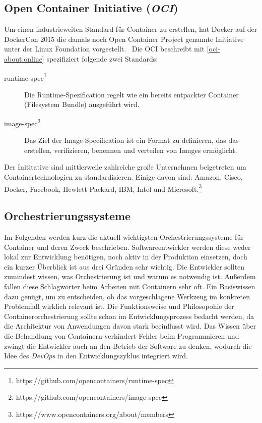 \subsection{Open Container Initiative (\emph{OCI})}
\label{sec:open-container-initiative}
Um einen industrieweiten Standard für Container zu erstellen, hat Docker auf der DockerCon 2015 die damals noch Open Container Project genannte Initiative unter der Linux Foundation vorgestellt.~\autocite{docker-ocp:online}
Die OCI beschreibt mit \autoref{oci-about:online} spezifiziert folgende zwei Standards:
\begin{description}
    \item [runtime-spec\footnote{https://github.com/opencontainers/runtime-spec}] Die Runtime-Spezification regelt wie ein bereits entpackter Container (Filesystem Bundle) ausgeführt wird.
    \item [image-spec\footnote{https://github.com/opencontainers/image-spec}] Das Ziel der Image-Specification ist ein Format zu definieren, das das erstellen, verifizieren, benennen und verteilen von Images ermöglicht.
\end{description}
Der Inititative sind mittlerweile zahlreiche große Unternehmen beigetreten um Containertechnologien zu standardisieren. Einige davon sind: Amazon, Cisco, Docker, Facebook, Hewlett Packard, IBM, Intel und Microsoft.\footnote{https://www.opencontainers.org/about/members}

\subsection{Orchestrierungssysteme}
\label{sec:orchestrierungssysteme}
Im Folgenden werden kurz die aktuell wichtigsten Orchestrierungssysteme für Container und deren Zweck beschrieben.
Softwareentwickler werden diese weder lokal zur Entwicklung benötigen, noch aktiv in der Produktion einsetzen, doch ein kurzer Überblick ist aus drei Gründen sehr wichtig.
Die Entwickler sollten zumindest wissen, was Orchestrierung ist und warum es notwendig ist.
Außerdem fallen diese Schlagwörter beim Arbeiten mit Containern sehr oft. Ein Basiswissen dazu genügt, um zu entscheiden, ob das vorgeschlagene Werkzeug im konkreten Problemfall wirklich relevant ist.
Die Funktionsweise und Philosopohie der Containerorchestrierung sollte schon im Entwicklungsprozess bedacht werden, da die Architektur von Anwendungen davon stark beeinflusst wird.
Das Wissen über die Behandlung von Containern verhindert Fehler beim Programmieren und zwingt die Entwickler auch an den Betrieb der Software zu denken, wodurch die Idee des \emph{DevOps} in den Entwicklungszyklus integriert wird.

